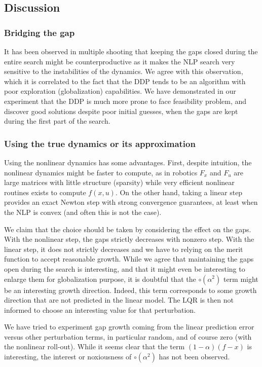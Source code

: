 \documentclass[10pt,a4paper]{article}
\begin{document}
\subsection{Discussion}

\subsubsection{Bridging the gap}
It has been observed in multiple shooting that keeping the gaps closed during the entire search might be counterproductive as it makes the NLP search very sensitive to the instabilities of the dynamics.
We agree with this observation, which it is correlated to the fact that the DDP tends to be an algorithm with poor exploration (globalization) capabilities.
We have demonstrated in our experiment that the DDP is much more prone to face feasibility problem, and discover good solutions despite poor initial guesses, when the gaps are kept during the first part of the search.

\subsubsection{Using the true dynamics or its approximation}
Using the nonlinear dynamics has some advantages.
First, despite intuition, the nonlinear dynamics might be faster to compute, as in robotics $F_x$ and $F_u$ are large matrices with little structure (sparsity) while very efficient nonlinear routines exists to compute $f(x,u)$. On the other hand, taking a linear step provides an exact Newton step with strong convergence guarantees, at least when the NLP is convex (and often this is not the case).

We claim that the choice should be taken by considering the effect on the gaps.
With the nonlinear step, the gaps strictly decreases with nonzero step.
With the linear step, it does not strictly decreases and we have to relying on the merit function to accept reasonable growth.
While we agree that maintaining the gaps open during the search is interesting, and that it might even be interesting to enlarge them for globalization purpose, it is doubtful that the $\circ(\alpha^2)$ term might be an interesting growth direction.
Indeed, this term corresponds to some growth direction that are not predicted in the linear model.
The LQR is then not informed to choose an interesting value for that perturbation.

We have tried to experiment gap growth coming from the linear prediction error versus other perturbation terms, in particular random, and of course zero (with the nonlinear roll-out).
While it seems clear that the term $(1-\alpha)(f-x)$ is interesting, the interest or noxiousness of $\circ(\alpha^2)$ has not been observed.
\end{document}
